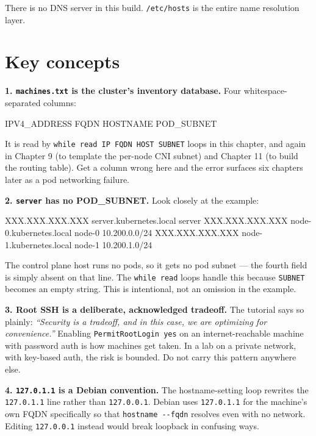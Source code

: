 \documentclass[11pt,oneside]{report}
\begin{document}
There is no DNS
server in this
build.
\texttt{/etc/hosts}
is the entire name
resolution layer.

\hypertarget{key-concepts-3}{%
\section{Key
concepts}\label{key-concepts-3}}

\textbf{1.
\texttt{machines.txt}
is the cluster's
inventory database.}
Four
whitespace-separated
columns:

\begin{outlst}
IPV4_ADDRESS FQDN HOSTNAME POD_SUBNET
\end{outlst}

It is read by
\texttt{while\ read\ IP\ FQDN\ HOST\ SUBNET}
loops in this
chapter, and again
in Chapter 9 (to
template the
per-node CNI subnet)
and Chapter 11 (to
build the routing
table). Get a column
wrong here and the
error surfaces six
chapters later as a
pod networking
failure.

\textbf{2.
\texttt{server} has
no POD\_SUBNET.}
Look closely at the
example:

\begin{outlst}
XXX.XXX.XXX.XXX server.kubernetes.local server
XXX.XXX.XXX.XXX node-0.kubernetes.local node-0 10.200.0.0/24
XXX.XXX.XXX.XXX node-1.kubernetes.local node-1 10.200.1.0/24
\end{outlst}

The control plane
host runs no pods,
so it gets no pod
subnet --- the
fourth field is
simply absent on
that line. The
\texttt{while\ read}
loops handle this
because
\texttt{SUBNET}
becomes an empty
string. This is
intentional, not an
omission in the
example.

\textbf{3. Root SSH
is a deliberate,
acknowledged
tradeoff.} The
tutorial says so
plainly:
\emph{``Security is
a tradeoff, and in
this case, we are
optimizing for
convenience.''}
Enabling
\texttt{PermitRootLogin\ yes}
on an
internet-reachable
machine with
password auth is how
machines get taken.
In a lab on a
private network,
with key-based auth,
the risk is bounded.
Do not carry this
pattern anywhere
else.

\textbf{4.
\texttt{127.0.1.1}
is a Debian
convention.} The
hostname-setting
loop rewrites the
\texttt{127.0.1.1}
line rather than
\texttt{127.0.0.1}.
Debian uses
\texttt{127.0.1.1}
for the machine's
own FQDN
specifically so that
\texttt{hostname\ -\/-fqdn}
resolves even with
no network. Editing
\texttt{127.0.0.1}
instead would break
loopback in
confusing ways.
\end{document}
